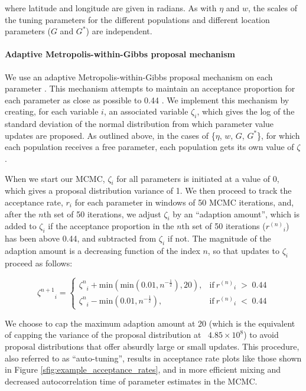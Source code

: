 \documentclass[12pt]{article}
\newcommand{\identifyadmixsource}[1]{{#1^{*}}}
\begin{document}
where latitude and longitude are given in radians.  As with $\eta$ and $w$, the scales of the tuning parameters for the different populations and different location parameters ($G$ and $\identifyadmixsource{G}$) are independent.


\paragraph{Adaptive Metropolis-within-Gibbs proposal mechanism}
We use an adaptive Metropolis-within-Gibbs proposal mechanism on each parameter \citep{roberts2009examples,rosenthal2010_optimal}.  This mechanism attempts to maintain an acceptance proportion for each parameter as close as possible to 0.44 \citep[optimal for one-dimensional proposal mechanisms;][]{Roberts1997,Roberts2001}.  We implement this mechanism by creating, for each variable $i$, an associated variable $\zeta_i$, which gives the log of the standard deviation of the normal distribution from which parameter value updates are proposed.  As outlined above, in the cases of \{$\eta$, $w$, $G$, $\identifyadmixsource{G}$\}, for which each population receives a free parameter, each population gets its own value of $\zeta$.  

When we start our MCMC, $\zeta_i$ for all parameters is initiated at a value of 0, which gives a proposal distribution variance of 1.  We then proceed to track the acceptance rate, $r_i$ for each parameter in windows of 50 MCMC iterations, and, after the $n$th set of 50 iterations, we adjust $\zeta_i$ by an ``adaption amount'', which is added to $\zeta_i$ if the acceptance proportion in the $n$th set of 50 iterations (${r^{(n)}}_i$) has been above 0.44, and subtracted from $\zeta_i$ if not.  The magnitude of the adaption amount is a decreasing function of the index $n$, so that updates to $\zeta_i$ proceed as follows:

\begin{equation}
{\zeta^{n+1}}_i =
\begin{cases}
{\zeta^{n}}_i + \text{min}(\text{min}(0.01,n^{-\frac{1}{2}}),20), & \text{if} \: {r^{(n)}}_i \; > \; 0.44 \\
{\zeta^{n}}_i - \text{min}(0.01,n^{-\frac{1}{2}}), & \text{if} \: {r^{(n)}}_i \; < \; 0.44
\end{cases}
\label{eq:adpative_mcmc}
\end{equation}

We choose to cap the maximum adaption amount at 20 (which is the equivalent of capping the variance of the proposal distribution at ~$4.85 \times 10^8$) to avoid proposal distributions that offer absurdly large or small updates.  This procedure, also referred to as ``auto-tuning'', results in acceptance rate plots like those shown in Figure \ref{sfig:example_acceptance_rates}, and in more efficient mixing and decreased autocorrelation time of parameter estimates in the MCMC.
\end{document}
